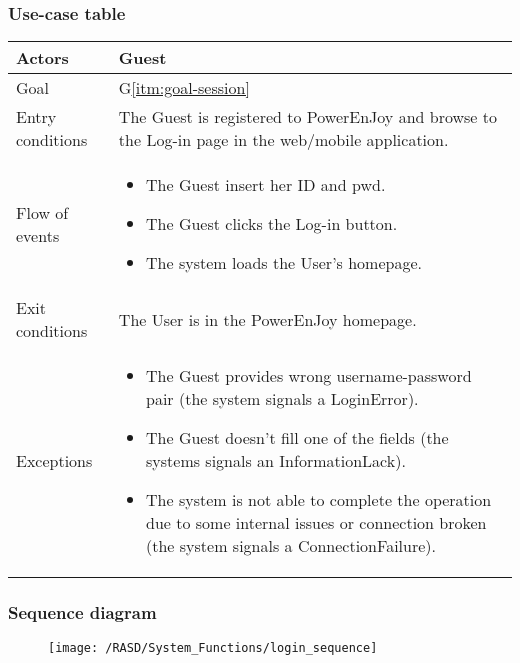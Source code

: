 \subsubsection{Use-case table}
\begin{center}
  \begin{tabular}{ l | p{10cm} }
    \hline
    Actors & Guest\\ \hline
    Goal & G\ref{itm:goal-session}\\ \hline
    Entry conditions & The Guest is registered to PowerEnJoy and browse to the Log-in page in the web/mobile application. \\ \hline
    Flow of events &
\begin{itemize}
\item The Guest insert her \gls{ID} and \gls{pwd}.
\item The Guest clicks the Log-in button.
\item The system loads the User's homepage.
\end{itemize} \\ \hline
    Exit conditions & The User is in the PowerEnJoy homepage. \\ \hline
  Exceptions & 
\begin{itemize}
\item The Guest provides wrong username-password pair (the system signals a LoginError).
\item The Guest doesn't fill one of the fields (the systems signals an InformationLack).
\item The system is not able to complete the operation due to some internal issues or connection broken (the system signals a ConnectionFailure).
\end{itemize} \\ \hline
  \end{tabular}
\end{center}


\subsubsection{Sequence diagram}
\begin{figure}[!ht]
  \centering
  \vspace{0.1cm}
  \texttt{[image: /RASD/System\_Functions/login\_sequence]}\\
  \vspace{0.1cm}
  \label{fig:login_sequence} 
\end{figure}

